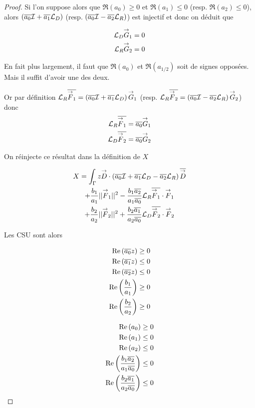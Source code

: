 \begin{proof}
    Si l'on suppose alors que \(\Re(a_0) \ge 0 \) et \(\Re(a_1) \le 0\) (resp. \(\Re(a_2)\le0\)), alors \(\left({\overline{a_0}} {\mathcal{I}} + {\overline{a_1}} {\mathcal{L}_D} \right)\) (resp. \(\left({\overline{a_0}} {\mathcal{I}} - {\overline{a_2}} {\mathcal{L}_R} \right)\)) est injectif et donc on déduit que

    \begin{align}
      {\mathcal{L}_D}{\overset{\rightarrow}{G}}_1 = 0
      \\
      {\mathcal{L}_R}{\overset{\rightarrow}{G}}_2 = 0
    \end{align}

  \begin{TODO}
    En fait plus largement, il faut que \(\Re(a_0)\) et \(\Re(a_{1/2})\) soit de signes opposées. Mais il suffit d'avoir une des deux.
  \end{TODO}

    Or par définition \({\mathcal{L}_R}{\overline{{\overset{\rightarrow}{F}}_1}} = \left({\overline{a_0}} {\mathcal{I}} + {\overline{a_1}} {\mathcal{L}_D} \right){\overset{\rightarrow}{G}}_1\) (resp. \({\mathcal{L}_R}{\overline{{\overset{\rightarrow}{F}}_2}} = \left({\overline{a_0}} {\mathcal{I}} - {\overline{a_2}} {\mathcal{L}_R} \right){\overset{\rightarrow}{G}}_2\)) donc
    \begin{align}
      {\mathcal{L}_R}{\overline{{\overset{\rightarrow}{F}}_1}} &= {\overline{a_0}}{\overset{\rightarrow}{G}}_1
      \\
      {\mathcal{L}_D}{\overline{{\overset{\rightarrow}{F}}_2}} &= {\overline{a_0}}{\overset{\rightarrow}{G}}_2
    \end{align}

    On réinjecte ce résultat dans la définition de \(X\)

    \begin{multline}
      X = \int_\Gamma z {\overset{\rightarrow}{D}} \cdot \left({\overline{a_0}} {\mathcal{I}} + {\overline{a_1}} {\mathcal{L}_D} - {\overline{a_2}}{\mathcal{L}_R}\right){\overline{{\overset{\rightarrow}{D}}}}
      \\
      + \dfrac{b_1}{a_1} ||{\overset{\rightarrow}{F}}_1||^2 - \dfrac{b_1{\overline{a_2}}}{a_1{\overline{a_0}}} {\mathcal{L}_R}{\overline{{\overset{\rightarrow}{F}}_1}}\cdot{\overset{\rightarrow}{F}}_1
      \\
      + \dfrac{b_2}{a_2} ||{\overset{\rightarrow}{F}}_2||^2 + \dfrac{b_2{\overline{a_1}}}{a_2{\overline{a_0}}} {\mathcal{L}_D}{\overline{{\overset{\rightarrow}{F}}_2}}\cdot{\overset{\rightarrow}{F}}_2
    \end{multline}

    Les CSU sont alors

    \begin{minipage}{0.5\textwidth}
    \begin{align}
      \operatorname{Re}\left({\overline{a_0}}z\right) \ge 0
      \\
      \operatorname{Re}\left({\overline{a_1}}z\right) \le 0
      \\
      \operatorname{Re}\left({\overline{a_2}}z\right) \le 0
      \\
      \operatorname{Re}\left(\dfrac{b_1}{a_1}\right) \ge 0
      \\
      \operatorname{Re}\left(\dfrac{b_2}{a_2}\right) \ge 0
    \end{align}
    \end{minipage}
    \begin{minipage}{0.49\textwidth}
    \begin{align}
      \operatorname{Re}\left(a_0\right) \ge 0
      \\
      \operatorname{Re}\left(a_1\right) \le 0
      \\
      \operatorname{Re}\left(a_2\right) \le 0
      \\
      \operatorname{Re}\left(\dfrac{b_1{\overline{a_2}}}{a_1{\overline{a_0}}}\right) \le 0
      \\
      \operatorname{Re}\left(\dfrac{b_2{\overline{a_1}}}{a_2{\overline{a_0}}}\right) \le 0
    \end{align}
    \end{minipage}
  \end{proof}